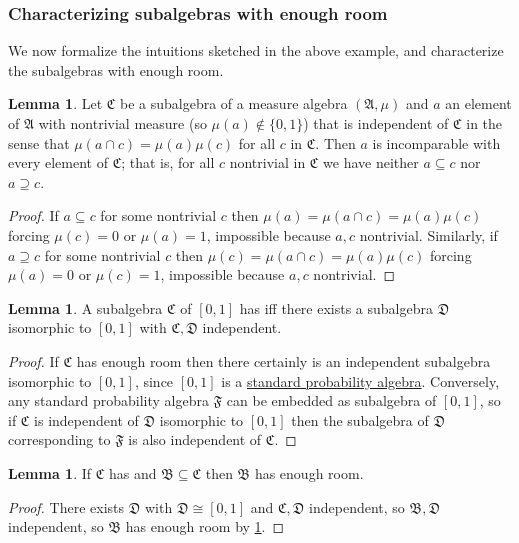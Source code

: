 \documentclass[
  sigconf,
  screen, ]{acmart}
\theoremstyle{definition}
\newtheorem{lemma}[theorem]{Lemma}
\newcommand\frakA{\mathfrak A}
\newcommand\frakB{\mathfrak B}
\newcommand\frakC{\mathfrak C}
\newcommand\frakD{\mathfrak D}
\newcommand\frakF{\mathfrak F}
\newcommand\dlc[1]{}
\newcommand\dlc[1]{}
\newcommand\nref[2]{\hyperref[#1]{#2}} \newcommand\checkhigh{{\huge{\color{red}\textbf{TODO: check}}}}
\newcommand\flavortext{}
\begin{document}
\dlc{subalgebra-with-not-enough-room}

\fi 

\subsubsection{Characterizing subalgebras with enough room}

\ifdefined\flavortext
We now formalize the intuitions sketched in the
above example, and characterize the subalgebras with enough room.

\begin{lemma} \label{app:lem:indep-incomparable}
  Let $\frakC$ be a subalgebra of a measure algebra $(\frakA,\mu)$
  and $a$ an element of $\frakA$ with nontrivial measure (so $\mu(a)\notin\{0,1\}$)
  that is independent of $\frakC$ in the sense that $\mu(a\cap c) = \mu(a)\mu(c)$
  for all $c$ in $\frakC$.
  Then $a$ is 
  incomparable with every element of $\frakC$;
  that is, for all $c$ nontrivial in $\frakC$ we have neither $a\subseteq c$ nor $a\supseteq c$.
\end{lemma}
\begin{proof}
  If $a\subseteq c$ for some nontrivial $c$ then $\mu(a) = \mu(a\cap c) = \mu(a)\mu(c)$
  forcing $\mu(c) = 0$ or $\mu(a) = 1$, impossible because $a,c$ nontrivial.
  Similarly, if $a\supseteq c$ for some nontrivial $c$
  then $\mu(c) = \mu(a\cap c) = \mu(a)\mu(c)$
  forcing $\mu(a) = 0$ or $\mu(c) = 1$, impossible because $a,c$ nontrivial.
\end{proof}

\fi 

\begin{lemma} \label{app:lem:enough-room-interval}
  A subalgebra $\frakC$ of $[0,1]$ has 
  iff there exists a subalgebra $\frakD$ isomorphic to $[0,1]$
  with $\frakC,\frakD$ independent.
\end{lemma}
\begin{proof}
  If $\frakC$ has enough room then there certainly
  is an independent subalgebra isomorphic to $[0,1]$,
  since $[0,1]$ is a \nref{app:def:stdprobalg}{standard probability algebra}.
  Conversely, any standard probability algebra $\frakF$
  can be embedded as subalgebra of $[0,1]$,
  so if $\frakC$ is independent of $\frakD$ isomorphic to $[0,1]$
  then the subalgebra of $\frakD$ corresponding to $\frakF$
  is also independent of $\frakC$.
\end{proof}

\begin{lemma} \label{app:lem:enough-room-mono}
  If $\frakC$ has 
  and $\frakB\subseteq\frakC$
  then $\frakB$  has enough room.
\end{lemma}
\begin{proof}
  There exists $\frakD$ with $\frakD\cong[0,1]$ and $\frakC,\frakD$ independent,
  so $\frakB,\frakD$ independent,
  so $\frakB$ has enough room by \cref{app:lem:enough-room-interval}.
\end{proof}
\end{document}
